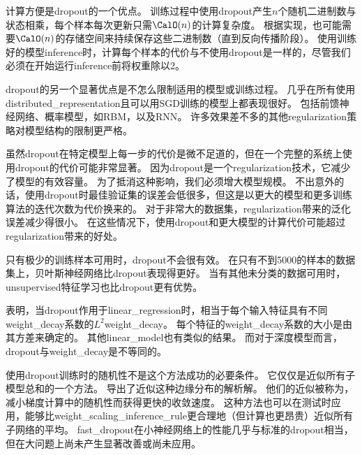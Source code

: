 计算方便是\gls{dropout}的一个优点。
训练过程中使用\gls{dropout}产生$n$个随机二进制数与状态相乘，每个样本每次更新只需$\CalO(n)$的计算复杂度。
根据实现，也可能需要$\CalO(n)$的存储空间来持续保存这些二进制数（直到反向传播阶段）。
使用训练好的模型\gls{inference}时，计算每个样本的代价与不使用\gls{dropout}是一样的，尽管我们必须在开始运行\gls{inference}前将权重除以2。


\gls{dropout}的另一个显著优点是不怎么限制适用的模型或训练过程。
几乎在所有使用\gls{distributed_representation}且可以用\gls{SGD}训练的模型上都表现很好。
包括前馈神经网络、概率模型，如\gls{RBM}\citep{Srivastava14}，以及\gls{RNN}\citep{Bayer-et-al-arXiv-2014,Pascanu-et-al-ICLR2014}。
许多效果差不多的其他\gls{regularization}策略对模型结构的限制更严格。

虽然\gls{dropout}在特定模型上每一步的代价是微不足道的，但在一个完整的系统上使用\gls{dropout}的代价可能非常显著。
因为\gls{dropout}是一个\gls{regularization}技术，它减少了模型的有效容量。
为了抵消这种影响，我们必须增大模型规模。
不出意外的话，使用\gls{dropout}时最佳验证集的误差会低很多，但这是以更大的模型和更多训练算法的迭代次数为代价换来的。
对于非常大的数据集，\gls{regularization}带来的泛化误差减少得很小。
在这些情况下，使用\gls{dropout}和更大模型的计算代价可能超过\gls{regularization}带来的好处。

只有极少的训练样本可用时，\gls{dropout}不会很有效。
在只有不到5000的样本的数据集上\citep{Xiong2011}，贝叶斯神经网络\citep{Neal1996}比\gls{dropout}表现得更好\citep{Srivastava14}。
当有其他未分类的数据可用时，\gls{unsupervised}特征学习也比\gls{dropout}更有优势。


\cite{Wager+al-2013}表明，当\gls{dropout}作用于\gls{linear_regression}时，相当于每个输入特征具有不同\gls{weight_decay}系数的$L^2$\gls{weight_decay}。 每个特征的\gls{weight_decay}系数的大小是由其方差来确定的。
其他\gls{linear_model}也有类似的结果。
而对于深度模型而言，\gls{dropout}与\gls{weight_decay}是不等同的。


使用\gls{dropout}训练时的随机性不是这个方法成功的必要条件。
它仅仅是近似所有子模型总和的一个方法。
\cite{WangManning-ICML2013-small}导出了近似这种边缘分布的解析解。
他们的近似被称为，减小梯度计算中的随机性而获得更快的收敛速度。
这种方法也可以在测试时应用，能够比\gls{weight_scaling_inference_rule}更合理地（但计算也更昂贵）近似所有子网络的平均。
\gls{fast_dropout}在小神经网络上的性能几乎与标准的\gls{dropout}相当，但在大问题上尚未产生显著改善或尚未应用。

